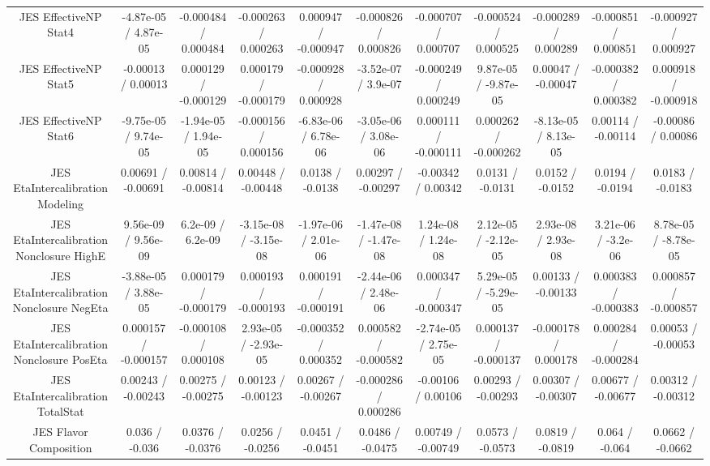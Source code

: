\begin{table}[htbp]
\begin{center}
\begin{tabular}{|c|c|c|c|c|c|c|c|c|c|c|}
  JES EffectiveNP Stat4 & -4.87e-05 / 4.87e-05 & -0.000484 / 0.000484 & -0.000263 / 0.000263 & 0.000947 / -0.000947 & -0.000826 / 0.000826 & -0.000707 / 0.000707 & -0.000524 / 0.000525 & -0.000289 / 0.000289 & -0.000851 / 0.000851 & -0.000927 / 0.000927 \\ 
  JES EffectiveNP Stat5 & -0.00013 / 0.00013 & 0.000129 / -0.000129 & 0.000179 / -0.000179 & -0.000928 / 0.000928 & -3.52e-07 / 3.9e-07 & -0.000249 / 0.000249 & 9.87e-05 / -9.87e-05 & 0.00047 / -0.00047 & -0.000382 / 0.000382 & 0.000918 / -0.000918 \\ 
  JES EffectiveNP Stat6 & -9.75e-05 / 9.74e-05 & -1.94e-05 / 1.94e-05 & -0.000156 / 0.000156 & -6.83e-06 / 6.78e-06 & -3.05e-06 / 3.08e-06 & 0.000111 / -0.000111 & 0.000262 / -0.000262 & -8.13e-05 / 8.13e-05 & 0.00114 / -0.00114 & -0.00086 / 0.00086 \\ 
  JES EtaIntercalibration Modeling & 0.00691 / -0.00691 & 0.00814 / -0.00814 & 0.00448 / -0.00448 & 0.0138 / -0.0138 & 0.00297 / -0.00297 & -0.00342 / 0.00342 & 0.0131 / -0.0131 & 0.0152 / -0.0152 & 0.0194 / -0.0194 & 0.0183 / -0.0183 \\ 
  JES EtaIntercalibration Nonclosure HighE & 9.56e-09 / 9.56e-09 & 6.2e-09 / 6.2e-09 & -3.15e-08 / -3.15e-08 & -1.97e-06 / 2.01e-06 & -1.47e-08 / -1.47e-08 & 1.24e-08 / 1.24e-08 & 2.12e-05 / -2.12e-05 & 2.93e-08 / 2.93e-08 & 3.21e-06 / -3.2e-06 & 8.78e-05 / -8.78e-05 \\ 
  JES EtaIntercalibration Nonclosure NegEta & -3.88e-05 / 3.88e-05 & 0.000179 / -0.000179 & 0.000193 / -0.000193 & 0.000191 / -0.000191 & -2.44e-06 / 2.48e-06 & 0.000347 / -0.000347 & 5.29e-05 / -5.29e-05 & 0.00133 / -0.00133 & 0.000383 / -0.000383 & 0.000857 / -0.000857 \\ 
  JES EtaIntercalibration Nonclosure PosEta & 0.000157 / -0.000157 & -0.000108 / 0.000108 & 2.93e-05 / -2.93e-05 & -0.000352 / 0.000352 & 0.000582 / -0.000582 & -2.74e-05 / 2.75e-05 & 0.000137 / -0.000137 & -0.000178 / 0.000178 & 0.000284 / -0.000284 & 0.00053 / -0.00053 \\ 
  JES EtaIntercalibration TotalStat & 0.00243 / -0.00243 & 0.00275 / -0.00275 & 0.00123 / -0.00123 & 0.00267 / -0.00267 & -0.000286 / 0.000286 & -0.00106 / 0.00106 & 0.00293 / -0.00293 & 0.00307 / -0.00307 & 0.00677 / -0.00677 & 0.00312 / -0.00312 \\ 
  JES Flavor Composition & 0.036 / -0.036 & 0.0376 / -0.0376 & 0.0256 / -0.0256 & 0.0451 / -0.0451 & 0.0486 / -0.0475 & 0.00749 / -0.00749 & 0.0573 / -0.0573 & 0.0819 / -0.0819 & 0.064 / -0.064 & 0.0662 / -0.0662 \\ 

\end{tabular}
\end{center}
\end{table}
